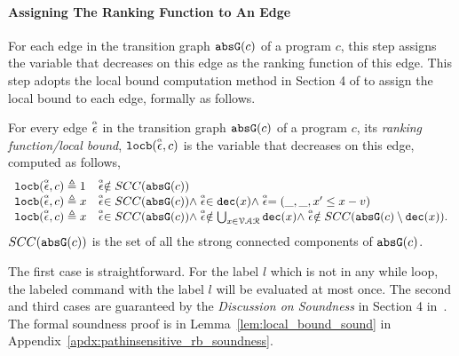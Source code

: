 \paragraph*{Assigning The Ranking Function to An Edge}
For each edge in the transition graph $\mathtt{abs}{\mathtt{G}}(c)$ of a program $c$,
this step assigns the variable that decreases on this edge as the ranking function   of this edge.
This step adopts the local bound computation method in Section 4 of \cite{sinn2017complexity} to assign the local bound to each edge,
formally as follows.
\begin{defn}
  \label{def:ranking_gen}
For every edge $\stackrel{\scriptscriptstyle{\alpha}}{\mathtt{\epsilon}{}}$ in the transition graph $\mathtt{abs}{\mathtt{G}}(c)$ of a program $c$,
its \emph{ranking function/local bound}, $\mathtt{locb}(\stackrel{\scriptscriptstyle{\alpha}}{\mathtt{\epsilon}{}}, c)$
is the variable that decreases on this edge, computed as follows,
%
\[ 
\begin{array}{ll}
  \mathtt{locb}(\stackrel{\scriptscriptstyle{\alpha}}{\mathtt{\epsilon}{}}, c) \triangleq 1 
  & \stackrel{\scriptscriptstyle{\alpha}}{\mathtt{\epsilon}{}} \notin SCC(\mathtt{abs}{\mathtt{G}}(c))
  \\
  \mathtt{locb}(\stackrel{\scriptscriptstyle{\alpha}}{\mathtt{\epsilon}{}}, c) \triangleq x
  & \stackrel{\scriptscriptstyle{\alpha}}{\mathtt{\epsilon}{}} \in SCC(\mathtt{abs}{\mathtt{G}}(c)) \land \stackrel{\scriptscriptstyle{\alpha}}{\mathtt{\epsilon}{}} \in \mathtt{dec}(x) \land  \stackrel{\scriptscriptstyle{\alpha}}{\mathtt{\epsilon}{}} = (\_, \_ , x' \leq x - v) \\
  \mathtt{locb}(\stackrel{\scriptscriptstyle{\alpha}}{\mathtt{\epsilon}{}}, c) \triangleq x
  & \stackrel{\scriptscriptstyle{\alpha}}{\mathtt{\epsilon}{}} \in SCC(\mathtt{abs}{\mathtt{G}}(c)) \land 
  \stackrel{\scriptscriptstyle{\alpha}}{\mathtt{\epsilon}{}}  \notin \bigcup_{x \in \mathcal{VAR}} \mathtt{dec}(x)
  \land \stackrel{\scriptscriptstyle{\alpha}}{\mathtt{\epsilon}{}} \notin SCC(\mathtt{abs}{\mathtt{G}}(c) \setminus \mathtt{dec}(x)).
\end{array}
\]
$SCC(\mathtt{abs}{\mathtt{G}}(c))$ is the set of all the strong connected components of $\mathtt{abs}{\mathtt{G}}(c)$.
\end{defn}
  The first case is straightforward. 
  For the label $l$ which is not in any while loop, 
  the labeled command with the label $l$ will be 
  evaluated at most once. 
  The second and third cases are guaranteed by the \emph{Discussion on Soundness} in Section 4 in~\cite{sinn2017complexity}.
  The formal soundness proof is in Lemma~\ref{lem:local_bound_sound} in Appendix~\ref{apdx:pathinsensitive_rb_soundness}.
%
